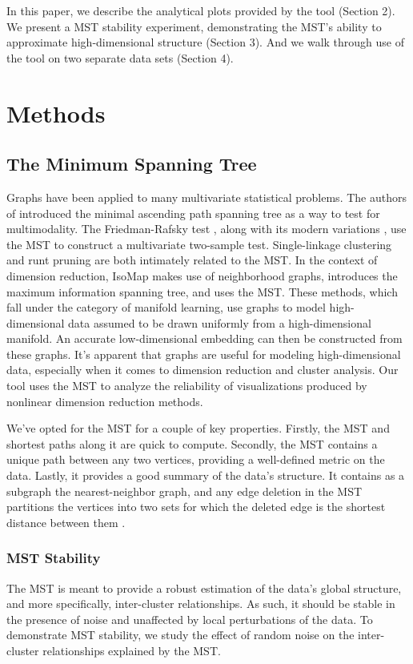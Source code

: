 \documentclass{article}
\begin{document}
{In this paper, we describe the analytical plots provided by the tool (Section 2). We present a MST stability experiment, demonstrating the MST's ability to approximate high-dimensional structure (Section 3). And we walk through use of the tool on two separate data sets (Section 4).
\section{Methods}

\subsection{The Minimum Spanning Tree}
Graphs have been applied to many multivariate statistical problems. The authors of \cite{MAP test} introduced the minimal ascending path spanning tree as a way to test for multimodality. The Friedman-Rafsky test \cite{Friedman-Rafsky test}, along with its modern variations \cite{Friedman-Rafsky variation 1, Friedman-Rafsky variation 2, Friedman-Rafsky variation 3}, use the MST to construct a multivariate two-sample test. Single-linkage clustering \cite{single-linkage and MST} and runt pruning \cite{runt pruning} are both intimately related to the MST. In the context of dimension reduction, IsoMap \cite{IsoMap} makes use of neighborhood graphs, \cite{MIST example} introduces the maximum information spanning tree, and \cite{MST example} uses the MST. These methods, which fall under the category of manifold learning, use graphs to model high-dimensional data assumed to be drawn uniformly from a high-dimensional manifold. An accurate low-dimensional embedding can then be constructed from these graphs. It's apparent that graphs are useful for modeling high-dimensional data, especially when it comes to dimension reduction and cluster analysis. Our tool uses the MST to analyze the reliability of visualizations produced by nonlinear dimension reduction methods.

We've opted for the MST for a couple of key properties. Firstly, the MST and shortest paths along it are quick to compute. Secondly, the MST contains a unique path between any two vertices, providing a well-defined metric on the data. Lastly, it provides a good summary of the data's structure. It contains as a subgraph the nearest-neighbor graph, and any edge deletion in the MST partitions the vertices into two sets for which the deleted edge is the shortest distance between them \cite{Friedman-Rafsky test}.

\subsubsection{MST Stability}
The MST is meant to provide a robust estimation of the data's global structure, and more specifically, inter-cluster relationships. As such, it should be stable in the presence of noise and unaffected by local perturbations of the data. To demonstrate MST stability, we study the effect of random noise on the inter-cluster relationships explained by the MST.

}
\end{document}
